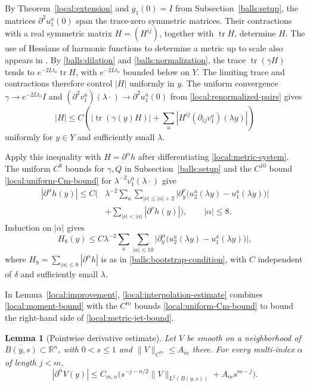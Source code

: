 \documentclass[11pt,a4paper]{article}
\newtheorem{lemma}[theorem]{Lemma}
\theoremstyle{definition}
\theoremstyle{remark}
\numberwithin{equation}{section}
\begin{document}
By Theorem~\ref{local:extension} and $g_1(0)=I$ from
Subsection~\ref{balls:setup}, the matrices $\partial^2u_1^a(0)$ span
the trace-zero symmetric matrices. Their contractions with a real
symmetric matrix $H=(H^{ij})$, together with $\operatorname{tr}H$,
determine $H$. The use of Hessians of harmonic functions to
determine a metric up to scale also appears in
\citep[Proposition~4.1 and Remark~4.2]{LLS20}.
By \eqref{balls:dilation} and \eqref{balls:normalization}, the trace
$\operatorname{tr}(\gamma H)$ tends to $e^{-2Lt_0}\operatorname{tr}H$,
with $e^{-2Lt_0}$ bounded below on $Y$. The limiting trace and
contractions therefore control $|H|$ uniformly in $y$.
The uniform convergence $\gamma\to e^{-2Lt_0}I$ and
$(\partial^2v_1^a)(\lambda\cdot)\to\partial^2u_1^a(0)$ from
\eqref{local:renormalized-pairs} gives
\[
 |H|\le C\left(
       |\operatorname{tr}(\gamma(y)H)|
          +\sum_a|H^{ij}(\partial_{ij}v_1^a)(\lambda y)|
          \right)
\]
uniformly for $y\in Y$ and sufficiently small $\lambda$.

Apply this inequality with $H=\partial^\alpha h$ after
differentiating \eqref{local:metric-system}. The uniform $C^8$
bounds for $\gamma,Q$ in Subsection~\ref{balls:setup} and the
$C^{10}$ bound \eqref{local:uniform-Cm-bound} for
$\lambda^{-2}v_1^a(\lambda\cdot)$ give
\begin{align*}
 |\partial^\alpha h(y)|\le C\biggl(
 &\lambda^{-2}\sum_a\sum_{|\nu|\le|\alpha|+2}
 \bigl|\partial_y^\nu\bigl(u_2^a(\lambda y)-u_1^a(\lambda y)\bigr)\bigr|\\
 &+\sum_{|\nu|<|\alpha|}|\partial^\nu h(y)|\biggr),
 \qquad |\alpha|\le8.
\end{align*}
Induction on $|\alpha|$ gives
\begin{equation}\label{local:metric-jet-bound}
 H_8(y)\leq C\lambda^{-2}\sum_a\sum_{|\alpha|\leq10}
 \bigl|\partial_y^\alpha\bigl(u_2^a(\lambda y)-u_1^a(\lambda y)\bigr)\bigr|,
\end{equation}
where $H_8=\sum_{|\alpha|\le8}|\partial^\alpha h|$ is as in
\eqref{balls:bootstrap-condition}, with $C$ independent of $\delta$
and sufficiently small $\lambda$.

In Lemma~\ref{local:improvement}, \eqref{local:interpolation-estimate}
combines \eqref{local:moment-bound} with the $C^m$ bounds
\eqref{local:uniform-Cm-bound} to bound the right-hand side of
\eqref{local:metric-jet-bound}.

\begin{lemma}[Pointwise derivative estimate]\label{local:interpolation}
Let $V$ be smooth on a neighborhood of $\overline{B(y,s)}\subset
\mathbb R^n$, with $0<s\leq1$ and $\|V\|_{C^m}\leq A_m$ there.
For every multi-index $\alpha$ of length $j<m$,
\begin{equation}\label{local:interpolation-estimate}
 |\partial^\alpha V(y)|\leq C_{m,n}
 \bigl(s^{-j-n/2}\|V\|_{L^2(B(y,s))}
                          +A_m s^{m-j}\bigr).
\end{equation}
\end{lemma}
\end{document}
